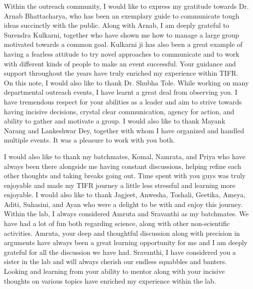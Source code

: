 Within the outreach community, I would like to express my gratitude towards Dr. Arnab Bhattacharya, who has been an exemplary guide to communicate tough ideas succinctly with the public. Along with Arnab, I am deeply grateful to Surendra Kulkarni, together who have shown me how to manage a large group motivated towards a common goal. Kulkarni ji has also been a great example of having a fearless attitude to try novel approaches to communicate and to work with different kinds of people to make an event successful. Your guidance and support throughout the years have truly enriched my experience within TIFR. On this note, I would also like to thank Dr. Shubha Tole. While working on many departmental outreach events, I have learnt a great deal from observing you. I have tremendous respect for your abilities as a leader and aim to strive towards having incisive decisions, crystal clear communication, agency for action, and ability to gather and motivate a group. I would also like to thank Mayank Narang and Lankeshwar Dey, together with whom I have organized and handled multiple events. It was a pleasure to work with you both.

I would also like to thank my batchmates, Komal, Namrata, and Priya who have always been there alongside me having constant discussions, helping refine each other thoughts and taking breaks going out. Time spent with you guys was truly enjoyable and made my TIFR journey a little less stressful and learning more enjoyable. I would also like to thank Jagjeet, Anwesha, Toshali, Geetika, Ameya, Aditi, Suhasini, and Ayan who were a delight to be with and enjoy this journey. Within the lab, I always considered Amruta and Sravanthi as my batchmates. We have had a lot of fun both regarding science, along with other non-scientific activities. Amruta, your deep and thoughtful discussion along with precision in arguments have always been a great learning opportunity for me and I am deeply grateful for all the discussion we have had. Sravanthi, I have considered you a sister in the lab and will always cherish our endless squabbles and banters. Looking and learning from your ability to mentor along with your incisive thoughts on various topics have enriched my experience within the lab.


